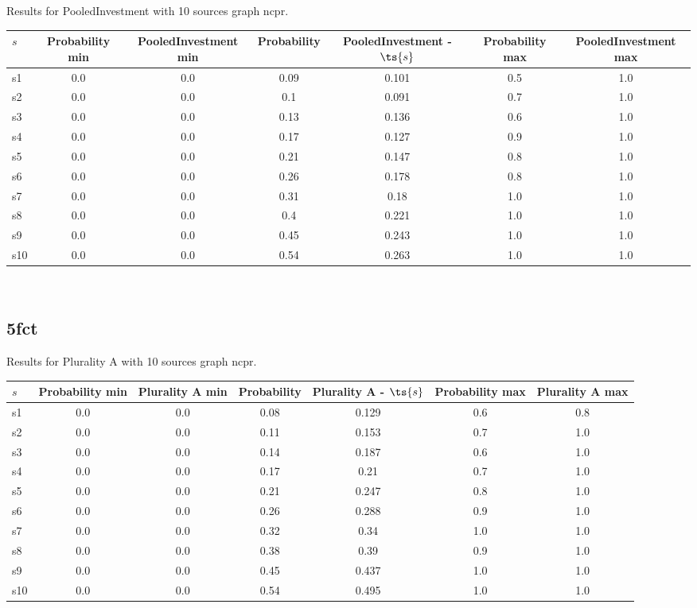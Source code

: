 \documentclass{article}
\begin{document}
\noindent Results for PooledInvestment with 10 sources graph ncpr.

\noindent\begin{tabular}{|l|c|c|c|c|c|c|}
\hline
$s$& Probability min & PooledInvestment min & Probability & PooledInvestment - $\ts{s}$ & Probability max & PooledInvestment max\\
\hline
s1 &0.0 & 0.0 & 0.09 & 0.101 & 0.5 & 1.0\\
\hline
s2 &0.0 & 0.0 & 0.1 & 0.091 & 0.7 & 1.0\\
\hline
s3 &0.0 & 0.0 & 0.13 & 0.136 & 0.6 & 1.0\\
\hline
s4 &0.0 & 0.0 & 0.17 & 0.127 & 0.9 & 1.0\\
\hline
s5 &0.0 & 0.0 & 0.21 & 0.147 & 0.8 & 1.0\\
\hline
s6 &0.0 & 0.0 & 0.26 & 0.178 & 0.8 & 1.0\\
\hline
s7 &0.0 & 0.0 & 0.31 & 0.18 & 1.0 & 1.0\\
\hline
s8 &0.0 & 0.0 & 0.4 & 0.221 & 1.0 & 1.0\\
\hline
s9 &0.0 & 0.0 & 0.45 & 0.243 & 1.0 & 1.0\\
\hline
s10 &0.0 & 0.0 & 0.54 & 0.263 & 1.0 & 1.0\\
\hline
\end{tabular}\\

\newpage

\subsection{5fct}

\noindent Results for Plurality A with 10 sources graph ncpr.

\noindent\begin{tabular}{|l|c|c|c|c|c|c|}
\hline
$s$& Probability min & Plurality A min & Probability & Plurality A - $\ts{s}$ & Probability max & Plurality A max\\
\hline
s1 &0.0 & 0.0 & 0.08 & 0.129 & 0.6 & 0.8\\
\hline
s2 &0.0 & 0.0 & 0.11 & 0.153 & 0.7 & 1.0\\
\hline
s3 &0.0 & 0.0 & 0.14 & 0.187 & 0.6 & 1.0\\
\hline
s4 &0.0 & 0.0 & 0.17 & 0.21 & 0.7 & 1.0\\
\hline
s5 &0.0 & 0.0 & 0.21 & 0.247 & 0.8 & 1.0\\
\hline
s6 &0.0 & 0.0 & 0.26 & 0.288 & 0.9 & 1.0\\
\hline
s7 &0.0 & 0.0 & 0.32 & 0.34 & 1.0 & 1.0\\
\hline
s8 &0.0 & 0.0 & 0.38 & 0.39 & 0.9 & 1.0\\
\hline
s9 &0.0 & 0.0 & 0.45 & 0.437 & 1.0 & 1.0\\
\hline
s10 &0.0 & 0.0 & 0.54 & 0.495 & 1.0 & 1.0\\
\hline
\end{tabular}\\
\end{document}
